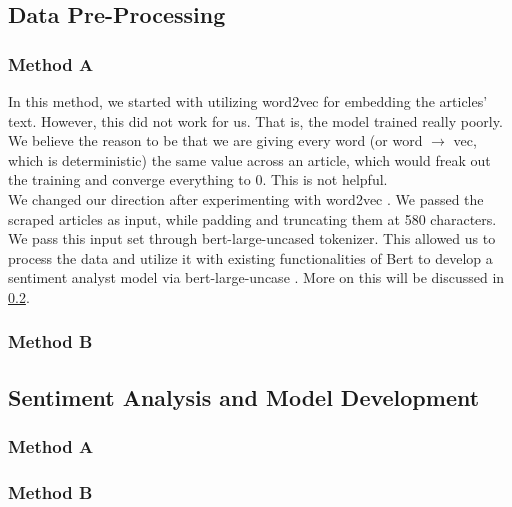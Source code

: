 \documentclass[twocolumn,12pt]{article}
\begin{document}
\begin{flushleft}
	\subsection{Data Pre-Processing} \label{data_preprocessing}
		\subsubsection{Method A \cite{metha}} \label{method_a}
		In this method, we started with utilizing word2vec \cite{w2v} for embedding the articles' text. However, this did not work for us. That is, the model trained really poorly. We believe the reason to be that we are giving every word (or word $\rightarrow$ vec, which is deterministic) the same value across an article, which would freak out the training and converge everything to 0. This is not helpful.\\
		We changed our direction after experimenting with word2vec \cite{w2v}. We passed the scraped articles as input, while padding and truncating them at 580 characters. We pass this input set through bert-large-uncased \cite{bert} tokenizer. This allowed us to process the data and utilize it with existing functionalities of Bert \cite{bert} to develop a sentiment analyst model via bert-large-uncase \cite{bert}. More on this will be discussed in \cref{model_dev}.
		
		\subsubsection{Method B \cite{methb}} \label{method_b}
			
	\subsection{Sentiment Analysis and Model Development} \label{model_dev}
	
		\subsubsection{Method A \cite{metha}} \label{method_a}
		
		\subsubsection{Method B \cite{methb}} \label{method_b}


\end{flushleft}
\end{document}
